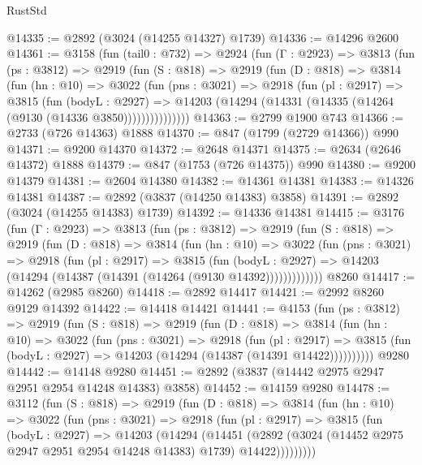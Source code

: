 \begin{lexlean}{RustStd}
\begin{coremodule}
@14335 := @2892 (@3024 (@14255 @14327) @1739)
@14336 := @14296 @2600
@14361 := @3158
    (fun (tail0 : @732) =>
    @2924
      (fun (Γ : @2923) =>
      @3813
        (fun (ps : @3812) =>
        @2919
          (fun (S : @818) =>
          @2919
            (fun (D : @818) =>
            @3814
              (fun (hn : @10) =>
              @3022
                (fun (pns : @3021) =>
                @2918
                  (fun (pl : @2917) =>
                  @3815
                    (fun (bodyL : @2927) =>
                    @14203 (@14294 (@14331 (@14335 (@14264 (@9130 (@14336 @3850)))))))))))))))
@14363 := @2799 @1900 @743
@14366 := @2733 (@726 @14363) @1888
@14370 := @847 (@1799 (@2729 @14366)) @990
@14371 := @9200 @14370
@14372 := @2648 @14371
@14375 := @2634 (@2646 @14372) @1888
@14379 := @847 (@1753 (@726 @14375)) @990
@14380 := @9200 @14379
@14381 := @2604 @14380
@14382 := @14361 @14381
@14383 := @14326 @14381
@14387 := @2892 (@3837 (@14250 @14383) @3858)
@14391 := @2892 (@3024 (@14255 @14383) @1739)
@14392 := @14336 @14381
@14415 := @3176
    (fun (Γ : @2923) =>
    @3813
      (fun (ps : @3812) =>
      @2919
        (fun (S : @818) =>
        @2919
          (fun (D : @818) =>
          @3814
            (fun (hn : @10) =>
            @3022
              (fun (pns : @3021) =>
              @2918
                (fun (pl : @2917) =>
                @3815
                  (fun (bodyL : @2927) =>
                  @14203 (@14294 (@14387 (@14391 (@14264 (@9130 @14392)))))))))))))
    @8260
@14417 := @14262 (@2985 @8260)
@14418 := @2892 @14417
@14421 := @2992 @8260 @9129 @14392
@14422 := @14418 @14421
@14441 := @4153
    (fun (ps : @3812) =>
    @2919
      (fun (S : @818) =>
      @2919
        (fun (D : @818) =>
        @3814
          (fun (hn : @10) =>
          @3022
            (fun (pns : @3021) =>
            @2918
              (fun (pl : @2917) =>
              @3815 (fun (bodyL : @2927) => @14203 (@14294 (@14387 (@14391 @14422))))))))))
    @9280
@14442 := @14148 @9280
@14451 := @2892 (@3837 (@14442 @2975 @2947 @2951 @2954 @14248 @14383) @3858)
@14452 := @14159 @9280
@14478 := @3112
    (fun (S : @818) =>
    @2919
      (fun (D : @818) =>
      @3814
        (fun (hn : @10) =>
        @3022
          (fun (pns : @3021) =>
          @2918
            (fun (pl : @2917) =>
            @3815
              (fun (bodyL : @2927) =>
              @14203
                (@14294
                  (@14451
                    (@2892
                      (@3024 (@14452 @2975 @2947 @2951 @2954 @14248 @14383) @1739)
                      @14422)))))))))

\end{coremodule}
\end{lexlean}
